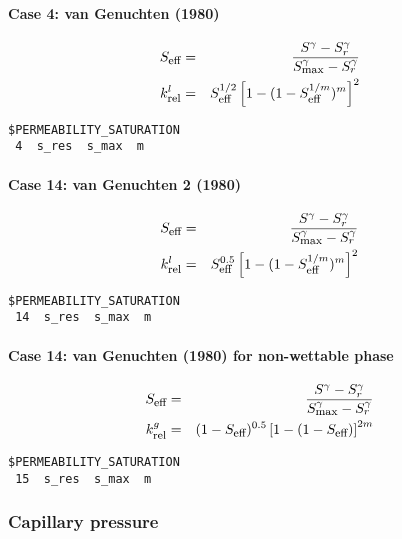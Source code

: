 \paragraph*{Case 4: van Genuchten (1980)}
\begin{eqnarray}
S_{\mbox{\footnotesize eff}}
&=&
\frac{S^\gamma-S_r^\gamma}{S_{\mbox{\footnotesize max}}^\gamma-S_r^\gamma}
\\
k_{\mbox{\footnotesize rel}}^l &=& S_{\mbox{\footnotesize eff}}^{1/2} \left[
1-(1-S_{\mbox{\footnotesize eff}}^{1/m})^m \right]^2
\end{eqnarray}
\begin{verbatim}
$PERMEABILITY_SATURATION
 4  s_res  s_max  m
\end{verbatim}

\paragraph*{Case 14: van Genuchten 2 (1980)}
\begin{eqnarray}
S_{\mbox{\footnotesize eff}} &=&
\frac{S^\gamma-S_r^\gamma}{S_{\mbox{\footnotesize max}}^\gamma-S_r^\gamma}
\\
k_{\mbox{\footnotesize rel}}^l &=& S_{\mbox{\footnotesize eff}}^{0.5} \left[
1-(1-S_{\mbox{\footnotesize eff}}^{1/m})^m \right]^2
\end{eqnarray}
\begin{verbatim}
$PERMEABILITY_SATURATION
 14  s_res  s_max  m
\end{verbatim}


\paragraph*{Case 14: van Genuchten (1980) for non-wettable phase}
\begin{eqnarray}
S_{\mbox{\footnotesize eff}} &=&
\frac{S^\gamma-S_r^\gamma}{S_{\mbox{\footnotesize max}}^\gamma-S_r^\gamma}
\\
k_{\mbox{\footnotesize rel}}^g &=& (1-S_{\mbox{\footnotesize eff}})^{0.5} \left[
1-(1-S_{\mbox{\footnotesize eff}}) \right]^{2m}
\end{eqnarray}
\begin{verbatim}
$PERMEABILITY_SATURATION
 15  s_res  s_max  m
\end{verbatim}

\subsubsection{Capillary pressure}

